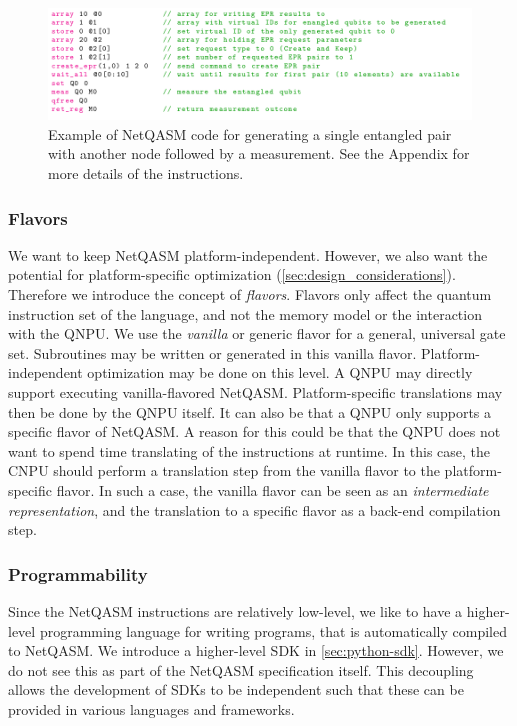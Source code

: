 \begin{figure}[t]
      \centering
      \includegraphics[width=0.6\linewidth]{figures/netqasm/nqasm_code_example}
      \caption{Example of NetQASM code for generating a single entangled pair with another node followed by a measurement.
            See the Appendix for more details of the instructions.}
      \label{fig:nqasm_code_example}
\end{figure}

\subsubsection{Flavors}
\label{sec:design_decisions_flavours}
We want to keep \ac{NetQASM} platform-independent.
However, we also want the potential for platform-specific optimization (\cref{sec:design_considerations}).
Therefore we introduce the concept of \textit{flavors}.
Flavors only affect the quantum instruction set of the language, and not the memory model or the interaction with the \ac{QNPU}.
We use the \textit{vanilla} or generic flavor for a general, universal gate set.
Subroutines may be written or generated in this vanilla flavor.
Platform-independent optimization may be done on this level.
A \ac{QNPU} may directly support executing vanilla-flavored \ac{NetQASM}.
Platform-specific translations may then be done by the \ac{QNPU} itself.
It can also be that a \ac{QNPU} only supports a specific flavor of \ac{NetQASM}.
A reason for this could be that the \ac{QNPU} does not want to spend time translating of the instructions at runtime.
In this case, the \ac{CNPU} should perform a translation step from the vanilla flavor to the platform-specific flavor.
In such a case, the vanilla flavor can be seen as an \textit{intermediate representation}, and the translation to a specific flavor as a back-end compilation step.

\subsubsection{Programmability}
Since the \ac{NetQASM} instructions are relatively low-level, we like to have a higher-level programming language for writing programs, that is automatically compiled to \ac{NetQASM}.
We introduce a higher-level SDK in \cref{sec:python-sdk}.
However, we do not see this as part of the \ac{NetQASM} specification itself.
This decoupling allows the development of SDKs to be independent such that these can be provided in various languages and frameworks.

